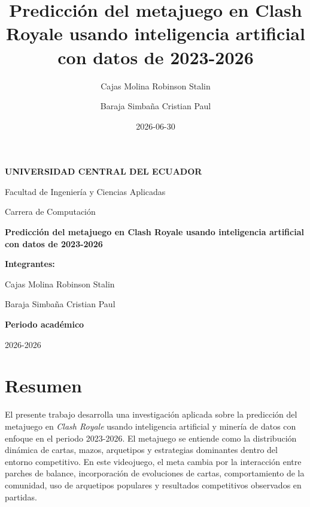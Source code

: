 \documentclass[
  spanish,
  12pt,
]{report}
\title{Predicción del metajuego en Clash Royale usando inteligencia
artificial con datos de 2023-2026}
\author{Cajas Molina Robinson Stalin \and Baraja Simbaña Cristian Paul}
\date{2026-06-30}
\let\maketitle\relax
\begin{document}
\maketitle


\begin{titlepage}
\begin{center}

\vspace*{1cm}

{\Large\textbf{UNIVERSIDAD CENTRAL DEL ECUADOR}}

\vspace{0.5cm}

{\large Facultad de Ingeniería y Ciencias Aplicadas}

\vspace{0.3cm}

{\large Carrera de Computación}

\vspace{2.5cm}

{\Huge\textbf{Predicción del metajuego en Clash Royale usando inteligencia artificial con datos de 2023-2026}}

\vspace{2.2cm}

\textbf{Integrantes:}

\vspace{0.3cm}

Cajas Molina Robinson Stalin

Baraja Simbaña Cristian Paul

\vfill

\textbf{Periodo académico}

2026-2026

\end{center}
\end{titlepage}

\tableofcontents
\newpage

\chapter*{Resumen}\label{resumen}

El presente trabajo desarrolla una investigación aplicada sobre la
predicción del metajuego en \emph{Clash Royale} usando inteligencia
artificial y minería de datos con enfoque en el periodo 2023-2026. El
metajuego se entiende como la distribución dinámica de cartas, mazos,
arquetipos y estrategias dominantes dentro del entorno competitivo. En
este videojuego, el meta cambia por la interacción entre parches de
balance, incorporación de evoluciones de cartas, comportamiento de la
comunidad, uso de arquetipos populares y resultados competitivos
observados en partidas.
\end{document}
